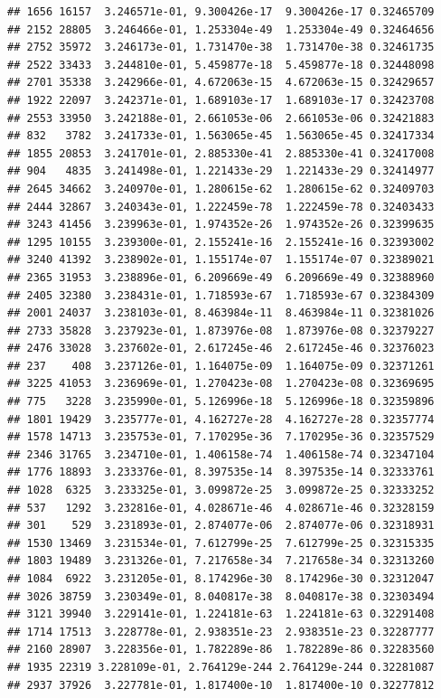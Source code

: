 \documentclass[
]{article}
\begin{document}
\begin{verbatim}
## 1656 16157  3.246571e-01, 9.300426e-17  9.300426e-17 0.32465709
## 2152 28805  3.246466e-01, 1.253304e-49  1.253304e-49 0.32464656
## 2752 35972  3.246173e-01, 1.731470e-38  1.731470e-38 0.32461735
## 2522 33433  3.244810e-01, 5.459877e-18  5.459877e-18 0.32448098
## 2701 35338  3.242966e-01, 4.672063e-15  4.672063e-15 0.32429657
## 1922 22097  3.242371e-01, 1.689103e-17  1.689103e-17 0.32423708
## 2553 33950  3.242188e-01, 2.661053e-06  2.661053e-06 0.32421883
## 832   3782  3.241733e-01, 1.563065e-45  1.563065e-45 0.32417334
## 1855 20853  3.241701e-01, 2.885330e-41  2.885330e-41 0.32417008
## 904   4835  3.241498e-01, 1.221433e-29  1.221433e-29 0.32414977
## 2645 34662  3.240970e-01, 1.280615e-62  1.280615e-62 0.32409703
## 2444 32867  3.240343e-01, 1.222459e-78  1.222459e-78 0.32403433
## 3243 41456  3.239963e-01, 1.974352e-26  1.974352e-26 0.32399635
## 1295 10155  3.239300e-01, 2.155241e-16  2.155241e-16 0.32393002
## 3240 41392  3.238902e-01, 1.155174e-07  1.155174e-07 0.32389021
## 2365 31953  3.238896e-01, 6.209669e-49  6.209669e-49 0.32388960
## 2405 32380  3.238431e-01, 1.718593e-67  1.718593e-67 0.32384309
## 2001 24037  3.238103e-01, 8.463984e-11  8.463984e-11 0.32381026
## 2733 35828  3.237923e-01, 1.873976e-08  1.873976e-08 0.32379227
## 2476 33028  3.237602e-01, 2.617245e-46  2.617245e-46 0.32376023
## 237    408  3.237126e-01, 1.164075e-09  1.164075e-09 0.32371261
## 3225 41053  3.236969e-01, 1.270423e-08  1.270423e-08 0.32369695
## 775   3228  3.235990e-01, 5.126996e-18  5.126996e-18 0.32359896
## 1801 19429  3.235777e-01, 4.162727e-28  4.162727e-28 0.32357774
## 1578 14713  3.235753e-01, 7.170295e-36  7.170295e-36 0.32357529
## 2346 31765  3.234710e-01, 1.406158e-74  1.406158e-74 0.32347104
## 1776 18893  3.233376e-01, 8.397535e-14  8.397535e-14 0.32333761
## 1028  6325  3.233325e-01, 3.099872e-25  3.099872e-25 0.32333252
## 537   1292  3.232816e-01, 4.028671e-46  4.028671e-46 0.32328159
## 301    529  3.231893e-01, 2.874077e-06  2.874077e-06 0.32318931
## 1530 13469  3.231534e-01, 7.612799e-25  7.612799e-25 0.32315335
## 1803 19489  3.231326e-01, 7.217658e-34  7.217658e-34 0.32313260
## 1084  6922  3.231205e-01, 8.174296e-30  8.174296e-30 0.32312047
## 3026 38759  3.230349e-01, 8.040817e-38  8.040817e-38 0.32303494
## 3121 39940  3.229141e-01, 1.224181e-63  1.224181e-63 0.32291408
## 1714 17513  3.228778e-01, 2.938351e-23  2.938351e-23 0.32287777
## 2160 28907  3.228356e-01, 1.782289e-86  1.782289e-86 0.32283560
## 1935 22319 3.228109e-01, 2.764129e-244 2.764129e-244 0.32281087
## 2937 37926  3.227781e-01, 1.817400e-10  1.817400e-10 0.32277812

\end{verbatim}
\end{document}
